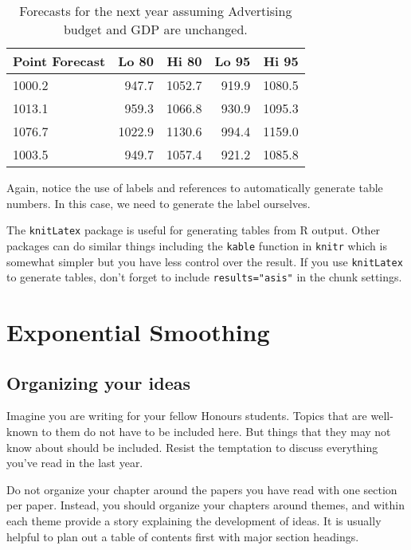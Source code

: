 \documentclass{monashthesis}
\begin{document}
\begin{table}[ht]
\begin{center}
\begin{tabular}{lrrrr}
\toprule
Point Forecast & Lo 80 & Hi 80 & Lo 95 & Hi 95 \\
\midrule
1000.2 &  947.7 & 1052.7 & 919.9 & 1080.5 \\
1013.1 &  959.3 & 1066.8 & 930.9 & 1095.3 \\
1076.7 & 1022.9 & 1130.6 & 994.4 & 1159.0 \\
1003.5 &  949.7 & 1057.4 & 921.2 & 1085.8 \\
\bottomrule
\end{tabular}
\caption{Forecasts for the next year assuming Advertising budget and GDP are unchanged.}
\label{tab:salesforecasts}
\end{center}
\end{table}

Again, notice the use of labels and references to automatically generate
table numbers. In this case, we need to generate the label ourselves.

The \texttt{knitLatex} package is useful for generating tables from R
output. Other packages can do similar things including the
\texttt{kable} function in \texttt{knitr} which is somewhat simpler but
you have less control over the result. If you use \texttt{knitLatex} to
generate tables, don't forget to include \texttt{results="asis"} in the
chunk settings.

\chapter{Exponential Smoothing}\label{sec:expsmooth}

\section{Organizing your ideas}\label{organizing-your-ideas}

Imagine you are writing for your fellow Honours students. Topics that
are well-known to them do not have to be included here. But things that
they may not know about should be included. Resist the temptation to
discuss everything you've read in the last year.

Do not organize your chapter around the papers you have read with one
section per paper. Instead, you should organize your chapters around
themes, and within each theme provide a story explaining the development
of ideas. It is usually helpful to plan out a table of contents first
with major section headings.
\end{document}
